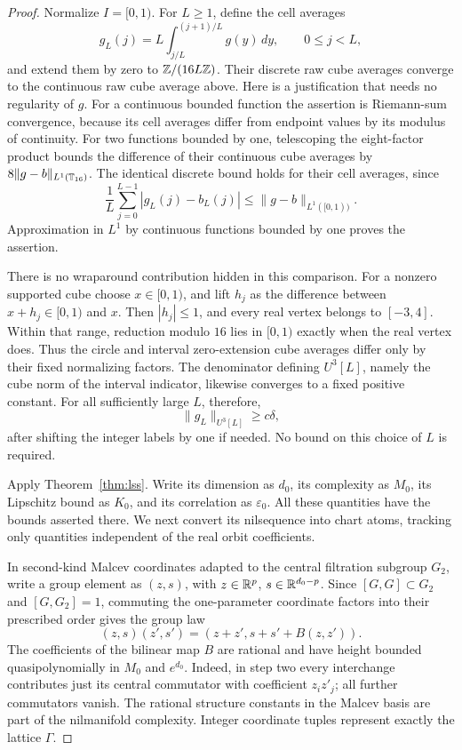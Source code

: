 \begin{proof}
Normalize \(I=[0,1)\).
For \(L\ge1\), define the cell averages
\[
 g_L(j)=L\int_{j/L}^{(j+1)/L}g(y)\,dy,\qquad 0\le j<L,
\]
and extend them by zero to \(\mathbb Z/(16L\mathbb Z)\).
Their discrete raw cube averages converge to the continuous raw
cube average above.  Here is a justification that needs no regularity
of \(g\).
For a continuous bounded function the assertion is Riemann-sum
convergence, because its cell averages differ from endpoint values
by its modulus of continuity.
For two functions bounded by one, telescoping the eight-factor product
bounds the difference of their continuous cube averages by
\(8\|g-b\|_{L^1(\mathbb T_{16})}\).
The identical discrete bound holds for their cell averages, since
\[
 \frac1L\sum_{j=0}^{L-1}|g_L(j)-b_L(j)|
       \le\|g-b\|_{L^1([0,1))}.
\]
Approximation in \(L^1\) by continuous functions bounded by one proves
the assertion.

There is no wraparound contribution hidden in this comparison.
For a nonzero supported cube choose \(x\in[0,1)\), and lift
\(h_j\) as the difference between \(x+h_j\in[0,1)\) and \(x\).
Then \(|h_j|\le1\), and every real vertex belongs to \([-3,4]\).
Within that range, reduction modulo \(16\) lies in \([0,1)\) exactly
when the real vertex does.
Thus the circle and interval zero-extension cube averages differ
only by their fixed normalizing factors.  The denominator defining
\(U^3[L]\), namely the cube norm of the interval indicator, likewise
converges to a fixed positive constant.  For all sufficiently large
\(L\), therefore,
\[
 \|g_L\|_{U^3[L]}\ge c\delta,
\]
after shifting the integer labels by one if needed.
No bound on this choice of \(L\) is required.

Apply Theorem~\ref{thm:lss}.  Write its dimension as \(d_0\), its
complexity as \(M_0\), its Lipschitz bound as \(K_0\), and its
correlation as \(\varepsilon_0\).
All these quantities have the bounds asserted there.
We next convert its nilsequence into chart atoms, tracking only
quantities independent of the real orbit coefficients.

In second-kind Malcev coordinates adapted to the central filtration
subgroup \(G_2\), write a group element as \((z,s)\), with
\(z\in\mathbb R^p\), \(s\in\mathbb R^{d_0-p}\).
Since \([G,G]\subset G_2\) and \([G,G_2]=1\), commuting the
one-parameter coordinate factors into their prescribed order gives
the group law
\[
 (z,s)(z',s')=(z+z',s+s'+B(z,z')).
\]
The coefficients of the bilinear map \(B\) are rational and have
height bounded quasipolynomially in \(M_0\) and \(e^{d_0}\).
Indeed, in step two every interchange contributes just its central
commutator with coefficient \(z_i z'_j\); all further commutators
vanish.  The rational structure constants in the Malcev basis are
part of the nilmanifold complexity.  Integer coordinate tuples
represent exactly the lattice \(\Gamma\).


\end{proof}
